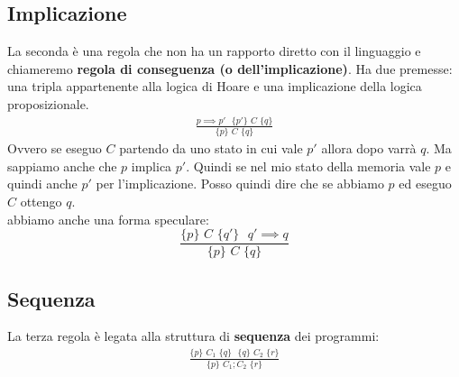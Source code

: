 \subsection{Implicazione}
\begin{definizione}
	La seconda è una regola che non ha un rapporto diretto con il linguaggio e
	chiameremo \textbf{regola di conseguenza (o dell'implicazione)}. Ha due
	premesse: una tripla appartenente alla logica di Hoare e una implicazione della
	logica proposizionale.
	\begin{align}\label{ImplicationRule}
		\frac{p\implies p'\,\, \,\,\{p'\}\,\, C\,\,\{q\}}{\{p\}\,\, C\,\,\{q\}} 
	\end{align}
	Ovvero se eseguo $C$ partendo da uno stato in cui vale $p'$ allora dopo varrà
	$q$. Ma sappiamo anche che $p$ implica $p'$. Quindi se nel mio stato della
	memoria vale $p$ e quindi anche $p'$ per l'implicazione. Posso quindi dire che
	se abbiamo $p$ ed eseguo $C$ ottengo $q$.\\
	abbiamo anche una forma speculare:
	\[\frac{\{p\}\,\, C\,\,\{q'\}\,\, \,\, q'\implies q}{\{p\}\,\, C\,\,\{q\}}\]
\end{definizione} \vspace{5mm} %
\subsection{Sequenza}
\begin{definizione}
	La terza regola è legata alla struttura di \textbf{sequenza} dei programmi:
	\begin{align}\label{SequenceRule}
		\frac{\{p\}\,\, C_1\,\,\{q\}\,\,                       
		\,\,\{q\}\,\, C_2\,\,\{r\}}{\{p\}\,\, C_1;C_2\,\,\{r\}} 
	\end{align}
		  
		
\end{definizione} \vspace{5mm} %
